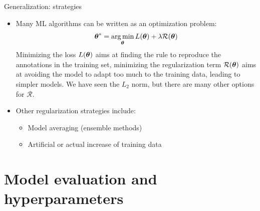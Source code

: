 \documentclass[xcolor=pdftex,dvipsnames,table]{beamer}
\begin{document}
\begin{frame}{Generalization: strategies}
\begin{itemize}
\item Many ML algorithms can be written as an optimization problem:
\begin{equation*}
\boldsymbol{\theta} ^{\ast} = \operatorname*{arg\,min}_{\boldsymbol{\theta}} L (\boldsymbol{\theta}) + \lambda \mathcal{R}(\boldsymbol{\theta})
\end{equation*}
Minimizing the loss $L (\boldsymbol{\theta})$ aims at finding the rule to reproduce the annotations in the training set, minimizing the regularization term $\mathcal{R}(\boldsymbol{\theta})$ aims at avoiding the model to adapt too much to the training data, leading to simpler models. We have seen the $L_2$ norm, but there are many other options for $\mathcal{R}$.
\item Other regularization strategies include:
\begin{itemize}
\item Model averaging (ensemble methods)
\item Artificial or actual increase of training data
\end{itemize}
\end{itemize}
\end{frame}

\section{Model evaluation and hyperparameters}
\end{document}
